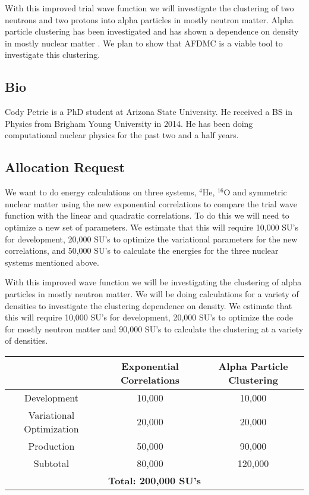 \documentclass[12pt,letterpaper]{article}
\begin{document}
With this improved trial wave function we will investigate the clustering of two neutrons and two protons into alpha particles in mostly neutron matter. Alpha particle clustering has been investigated and has shown a dependence on density in mostly nuclear matter \cite{schuck2013}. We plan to show that AFDMC is a viable tool to investigate this clustering.

\subsection*{Bio}
Cody Petrie is a PhD student at Arizona State University. He received a BS in Physics from Brigham Young University in 2014. He has been doing computational nuclear physics for the past two and a half years.

\subsection*{Allocation Request}
We want to do energy calculations on three systems, $^4$He, $^{16}$O and symmetric nuclear matter using the new exponential correlations to compare the trial wave function with the linear and quadratic correlations. To do this we will need to optimize a new set of parameters. We estimate that this will require 10,000 SU's for development, 20,000 SU's to optimize the variational parameters for the new correlations, and 50,000 SU's to calculate the energies for the three nuclear systems mentioned above.

With this improved wave function we will be investigating the clustering of alpha particles in mostly neutron matter. We will be doing calculations for a variety of densities to investigate the clustering dependence on density. We estimate that this will require 10,000 SU's for development, 20,000 SU's to optimize the code for mostly neutron matter and 90,000 SU's to calculate the clustering at a variety of densities.
\begin{table}[h!]
   \centering
   \begin{tabular}{|c|c|c|}
      \hline
       & Exponential Correlations & Alpha Particle Clustering\\
      \hline \hline
      Development & 10,000 & 10,000\\
      \hline
      Variational Optimization & 20,000 & 20,000\\
      \hline
      Production & 50,000 & 90,000\\
      \hline
      Subtotal & 80,000 & 120,000\\
      \hline \hline
      \multicolumn{3}{|c|}{\textbf{Total: 200,000 SU's}} \\
      \hline
   \end{tabular}
\end{table}


\newpage


\end{document}
